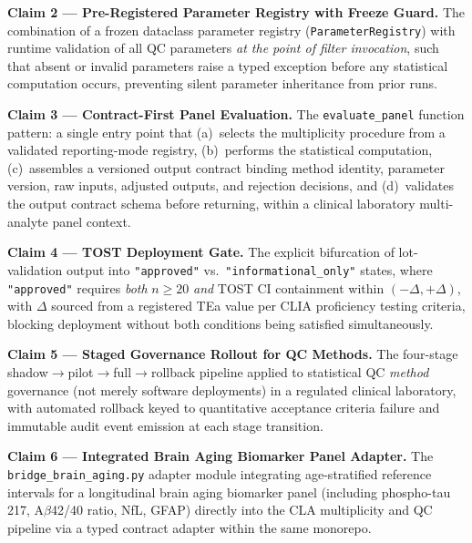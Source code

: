 \documentclass[11pt,a4paper]{article}
\begin{document}
\begin{noveltyenv}
\textbf{Claim 2 --- Pre-Registered Parameter Registry with Freeze Guard.}
The combination of a frozen dataclass parameter registry
(\texttt{ParameterRegistry}) with runtime validation of all QC parameters
\emph{at the point of filter invocation}, such that absent or invalid parameters
raise a typed exception before any statistical computation occurs, preventing
silent parameter inheritance from prior runs.
\end{noveltyenv}

\begin{noveltyenv}
\textbf{Claim 3 --- Contract-First Panel Evaluation.}
The \texttt{evaluate\_panel} function pattern: a single entry point that
(a)~selects the multiplicity procedure from a validated reporting-mode registry,
(b)~performs the statistical computation, (c)~assembles a versioned output
contract binding method identity, parameter version, raw inputs, adjusted
outputs, and rejection decisions, and (d)~validates the output contract schema
before returning, within a clinical laboratory multi-analyte panel context.
\end{noveltyenv}

\begin{noveltyenv}
\textbf{Claim 4 --- TOST Deployment Gate.}
The explicit bifurcation of lot-validation output into
\texttt{"approved"} vs.\ \texttt{"informational\_only"} states, where
\texttt{"approved"} requires \emph{both} $n \ge 20$ \emph{and} TOST CI
containment within $(-\Delta, +\Delta)$, with $\Delta$ sourced from a
registered TEa value per CLIA proficiency testing criteria, blocking
deployment without both conditions being satisfied simultaneously.
\end{noveltyenv}

\begin{noveltyenv}
\textbf{Claim 5 --- Staged Governance Rollout for QC Methods.}
The four-stage shadow$\to$pilot$\to$full$\to$rollback pipeline applied to
statistical QC \emph{method} governance (not merely software deployments) in a
regulated clinical laboratory, with automated rollback keyed to quantitative
acceptance criteria failure and immutable audit event emission at each stage
transition.
\end{noveltyenv}

\begin{noveltyenv}
\textbf{Claim 6 --- Integrated Brain Aging Biomarker Panel Adapter.}
The \texttt{bridge\_brain\_aging.py} adapter module integrating age-stratified
reference intervals for a longitudinal brain aging biomarker panel (including
phospho-tau\,217, A$\beta$42/40 ratio, NfL, GFAP) directly into the CLA
multiplicity and QC pipeline via a typed contract adapter within the same
monorepo.
\end{noveltyenv}
\end{document}
